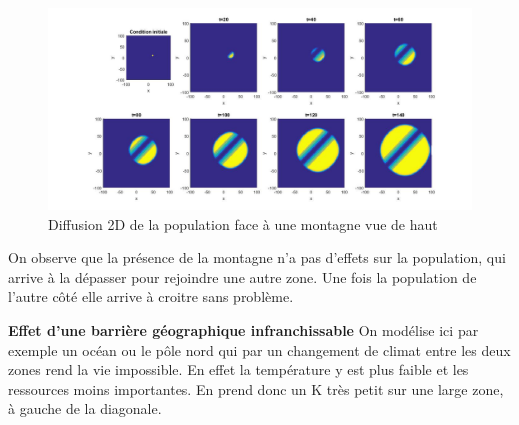 \documentclass[a4paper,11pt]{article}
\begin{document}
\begin{figure}[H]
	\centering
	\includegraphics[width=0.7\linewidth]{SimulationKPP/Enviro/montagneVueHaut}
	\caption{Diffusion 2D de la population face à une montagne vue de haut}
	\label{MontagneBis}
\end{figure}

On observe que la présence de la montagne n'a pas d'effets sur la population, qui arrive à la dépasser pour rejoindre une autre zone. Une fois la population de l'autre côté elle arrive à croitre sans problème.

\textbf{Effet d'une barrière géographique infranchissable}
On modélise ici par exemple un océan ou le pôle nord qui par un changement de climat entre les deux zones rend la vie impossible. En effet la température y est plus faible et les ressources moins importantes. En prend donc un K très petit sur une large zone, à gauche de la diagonale. 
\end{document}
